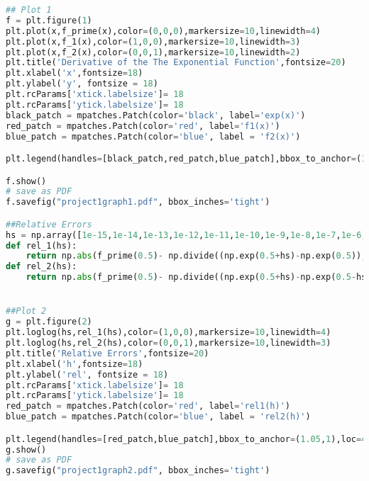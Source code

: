 \documentclass[answers,10pt]{exam}
\begin{document}
\begin{questions}
\begin{solution}
\begin{lstlisting}[language=Python]
## Plot 1
f = plt.figure(1)
plt.plot(x,f_prime(x),color=(0,0,0),markersize=10,linewidth=4)
plt.plot(x,f_1(x),color=(1,0,0),markersize=10,linewidth=3)
plt.plot(x,f_2(x),color=(0,0,1),markersize=10,linewidth=2)
plt.title('Derivative of the The Exponential Function',fontsize=20)
plt.xlabel('x',fontsize=18)
plt.ylabel('y', fontsize = 18) 
plt.rcParams['xtick.labelsize']= 18
plt.rcParams['ytick.labelsize']= 18
black_patch = mpatches.Patch(color='black', label='exp(x)')
red_patch = mpatches.Patch(color='red', label='f1(x)')
blue_patch = mpatches.Patch(color='blue', label = 'f2(x)')

plt.legend(handles=[black_patch,red_patch,blue_patch],bbox_to_anchor=(1.05,1),loc=2,borderaxespad=0.)

f.show()
# save as PDF
f.savefig("project1graph1.pdf", bbox_inches='tight')

##Relative Errors
hs = np.array([1e-15,1e-14,1e-13,1e-12,1e-11,1e-10,1e-9,1e-8,1e-7,1e-6,1e-5,1e-4,1e-3,1e-2,1e-1])
def rel_1(hs):
    return np.abs(f_prime(0.5)- np.divide((np.exp(0.5+hs)-np.exp(0.5)),hs))/np.exp(0.5)
def rel_2(hs):
    return np.abs(f_prime(0.5)- np.divide((np.exp(0.5+hs)-np.exp(0.5-hs)),2*hs))/np.exp(0.5)


##Plot 2
g = plt.figure(2)
plt.loglog(hs,rel_1(hs),color=(1,0,0),markersize=10,linewidth=4)
plt.loglog(hs,rel_2(hs),color=(0,0,1),markersize=10,linewidth=3)
plt.title('Relative Errors',fontsize=20)
plt.xlabel('h',fontsize=18)
plt.ylabel('rel', fontsize = 18) 
plt.rcParams['xtick.labelsize']= 18
plt.rcParams['ytick.labelsize']= 18
red_patch = mpatches.Patch(color='red', label='rel1(h)')
blue_patch = mpatches.Patch(color='blue', label = 'rel2(h)')

plt.legend(handles=[red_patch,blue_patch],bbox_to_anchor=(1.05,1),loc=4,borderaxespad=0.)
g.show()
# save as PDF
g.savefig("project1graph2.pdf", bbox_inches='tight')
\end{lstlisting}
\end{solution} 
\end{questions}
\end{document}
